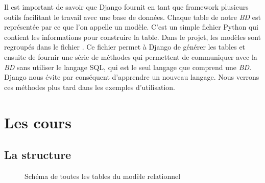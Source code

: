 \documentclass[a4paper,10pt,twoside]{sphinxmanual}
\begin{document}
Il est important de savoir que Django fournit en tant que framework plusieurs outils facilitant le travail avec une base de données. Chaque table de notre \emph{BD} est représentée par ce que l'on appelle un modèle. C'est un simple fichier Python qui contient les informations pour construire la table. Dans le projet, les modèles sont regroupés dans le fichier . Ce fichier permet à Django de générer les tables et ensuite de fournir une série de méthodes qui permettent de communiquer avec la \emph{BD} sans utiliser le langage SQL, qui est le seul langage que comprend une \emph{BD}. Django nous évite par conséquent d'apprendre un nouveau langage. Nous verrons ces méthodes plus tard dans les exemples d'utilisation.


\section{Les cours}
\label{models:les-cours}

\subsection{La structure}
\label{models:la-structure}\begin{figure}[htbp]
\centering
\capstart

\caption{Schéma de toutes les tables du modèle relationnel}\end{figure}
\end{document}

